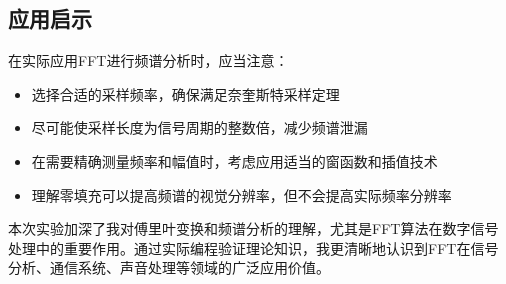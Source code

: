 \documentclass[12pt,hyperref,a4paper,UTF8]{ctexart}
\begin{document}
\subsection{应用启示}

在实际应用FFT进行频谱分析时，应当注意：

\begin{itemize}
    \item 选择合适的采样频率，确保满足奈奎斯特采样定理
    \item 尽可能使采样长度为信号周期的整数倍，减少频谱泄漏
    \item 在需要精确测量频率和幅值时，考虑应用适当的窗函数和插值技术
    \item 理解零填充可以提高频谱的视觉分辨率，但不会提高实际频率分辨率
\end{itemize}

本次实验加深了我对傅里叶变换和频谱分析的理解，尤其是FFT算法在数字信号处理中的重要作用。通过实际编程验证理论知识，我更清晰地认识到FFT在信号分析、通信系统、声音处理等领域的广泛应用价值。
\end{document}
